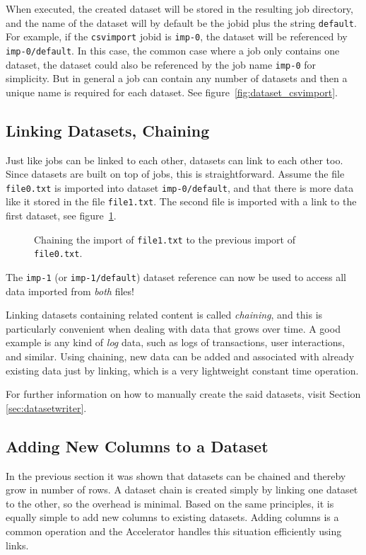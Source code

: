 When executed, the created dataset will be stored in the resulting job
directory, and the name of the dataset will by default be the jobid
plus the string \texttt{default}.  For example, if the
\texttt{csvimport} jobid is \texttt{imp-0}, the dataset will be
referenced by \texttt{imp-0/default}.  In this case, the common case
where a job only contains one dataset, the dataset could also be
referenced by the job name \texttt{imp-0} for simplicity.  But in
general a job can contain any number of datasets and then a unique
name is required for each dataset.  See
figure~\ref{fig:dataset_csvimport}.



\subsection{Linking Datasets, Chaining}

Just like jobs can be linked to each other, datasets can link to each
other too.  Since datasets are built on top of jobs, this is
straightforward.  Assume the file \texttt{file0.txt} is imported into
dataset \texttt{imp-0/default}, and that there is more data like it
stored in the file \texttt{file1.txt}.  The second file is imported
with a link to the first dataset, see
figure~\ref{fig:dataset_csvimport_chain}.
\begin{figure}[t]
  \begin{center}
    
    \caption{Chaining the import of \texttt{file1.txt} to the previous
      import of \texttt{file0.txt}.}
    \label{fig:dataset_csvimport_chain}
  \end{center}
\end{figure}
The \texttt{imp-1} (or \texttt{imp-1/default}) dataset reference can
now be used to access all data imported from \textsl{both} files!

Linking datasets containing related content is called \emph{chaining},
and this is particularly convenient when dealing with data that grows
over time.  A good example is any kind of \emph{log} data, such as
logs of transactions, user interactions, and similar.  Using chaining,
new data can be added and associated with already existing data just
by linking, which is a very lightweight constant time operation.

For further information on how to manually create the said datasets,
visit Section \ref{sec:datasetwriter}.



\subsection{Adding New Columns to a Dataset}
In the previous section it was shown that datasets can be chained and
thereby grow in number of rows.  A dataset chain is created simply by
linking one dataset to the other, so the overhead is minimal.  Based
on the same principles, it is equally simple to add new columns to
existing datasets.  Adding columns is a common operation and the
Accelerator handles this situation efficiently using links.

